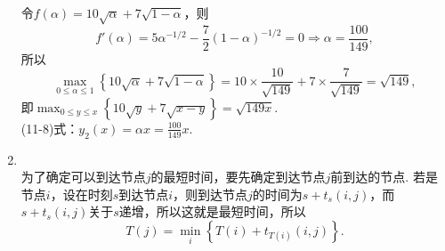 \begin{enumerate}[label=\arabic{section}.\arabic*]
    令$f(\alpha)=10\sqrt{\alpha}+7\sqrt{1-\alpha}$，则
    \[f'(\alpha)=5\alpha^{-1/2}-\frac{7}{2}(1-\alpha)^{-1/2}=0 \Rightarrow \alpha=\frac{100}{149},\]
    所以\[\max_{0 \leq \alpha \leq 1}\left\{10\sqrt{\alpha}+7\sqrt{1-\alpha}\right\}=10\times\frac{10}{\sqrt{149}}+7\times\frac{7}{\sqrt{149}}=\sqrt{149},\]
    即$\displaystyle \max_{0 \leq y \leq x}\left\{10\sqrt{y}+7\sqrt{x-y}\right\}=\sqrt{149x}$.\\
    (11-8)式：$\displaystyle y_2(x)=\alpha x=\frac{100}{149}x$.
    \item \pro\\
    为了确定可以到达节点$j$的最短时间，要先确定到达节点$j$前到达的节点. 若是节点$i$，设在时刻$s$到达节点$i$，则到达节点$j$的时间为$s+t_s(i,j)$，而$s+t_s(i,j)$关于$s$递增，所以这就是最短时间，所以
    \[T(j)=\min_i\left\{T(i)+t_{T(i)}(i,j)\right\}.\]
\end{enumerate}
\clearpage
